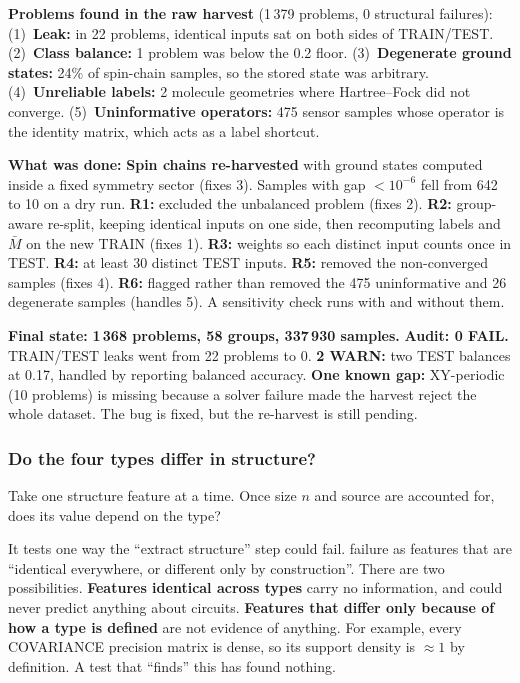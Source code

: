 \documentclass[10pt,a4paper]{article}
\newcommand{\M}{\bar{M}}
\begin{document}
\textbf{Problems found in the raw harvest} (1\,379 problems, 0 structural
failures):
(1)~\textbf{Leak:} in 22 problems, identical inputs sat on both sides
of TRAIN/TEST.
(2)~\textbf{Class balance:} 1 problem was below the 0.2 floor.
(3)~\textbf{Degenerate ground states:} 24\% of spin-chain samples, so
the stored state was arbitrary.
(4)~\textbf{Unreliable labels:} 2 molecule geometries where
Hartree--Fock did not converge.
(5)~\textbf{Uninformative operators:} 475 sensor samples whose
operator is the identity matrix, which acts as a label shortcut.

\textbf{What was done:}
\textbf{Spin chains re-harvested} with ground states computed
inside a fixed symmetry sector (fixes 3). Samples with gap $<10^{-6}$ fell from
642 to 10 on a dry run.
\textbf{R1:} excluded the unbalanced problem (fixes 2).
\textbf{R2:} group-aware re-split, keeping identical inputs on one
side, then recomputing labels and $\M$ on the new TRAIN (fixes 1).
\textbf{R3:} weights so each distinct input counts once in TEST.
\textbf{R4:} at least 30 distinct TEST inputs.
\textbf{R5:} removed the non-converged samples (fixes 4).
\textbf{R6:} flagged rather than removed the 475 uninformative and
26 degenerate samples (handles 5). A sensitivity check runs with and without
them.

\textbf{Final state:}
\textbf{1\,368 problems, 58 groups, 337\,930 samples.}
\textbf{Audit: 0 FAIL.} TRAIN/TEST leaks went from 22 problems to
0.
\textbf{2 WARN:} two TEST balances at 0.17, handled by reporting
balanced accuracy.
\textbf{One known gap:} XY-periodic (10 problems) is missing because a
solver failure made the harvest reject the whole dataset. The bug is fixed,
but the re-harvest is still pending.

\subsubsection{Do the four types differ in structure?}

Take one structure feature at a time. Once size $n$ and source are accounted
for, does its value depend on the type?

It tests one way the ``extract structure'' step could fail. failure as
features that are ``identical everywhere, or different only by construction''.
There are two possibilities.
\textbf{Features identical across types} carry no information, and
could never predict anything about circuits.
\textbf{Features that differ only because of how a type is
defined} are not evidence of anything. For example, every COVARIANCE
precision matrix is dense, so its support density is $\approx 1$ by
definition. A test that ``finds'' this has found nothing.
\end{document}
